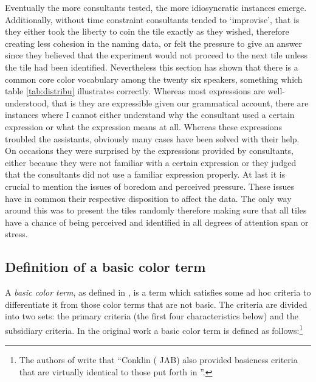 Eventually the more consultants tested, the more idiosyncratic instances emerge.
Additionally, without time constraint consultants tended to `improvise', that is
they either took the liberty to coin the tile exactly as they wished, therefore
creating less cohesion in the naming data, or felt the pressure to give  an
answer since they believed that the experiment would not proceed to the next
tile unless the tile had been identified. Nevertheless this section has shown 
that there is a common core color vocabulary among the twenty six speakers,
something which table \ref{tab:distribu} illustrates correctly. Whereas most
expressions are well-understood, that is they are expressible given our
grammatical account, there are  instances where I cannot either understand why
the consultant used a certain expression  or what the expression means at all.
Whereas these expressions troubled the assistants, obviously many cases have
been solved with their help. On occasions they were surprised by the expressions
provided by  consultants, either because they were not familiar with a certain
expression or they judged that the consultants did not use a familiar expression
properly. At last it is crucial to mention the issues of boredom and perceived
pressure. These issues have in common their respective disposition to affect the
data. The only way around this was to present the tiles randomly therefore
making sure that all tiles have a chance of being perceived and identified in
all degrees of attention span or stress. 

\clearpage

\subsection{Definition of a basic color term}
\label{sec:definitionBCT}

A \textit{basic color term}, as defined in  \citet[6-7, 37]{Berl69}, is a
term which satisfies some ad hoc criteria to differentiate it from those color
terms that are not basic. The criteria are divided into two sets: the primary
criteria (the first four characteristics below) and the subsidiary criteria. In
the original work a basic color term is defined as follows:\footnote{The authors of  
\cite{Maff97}  write that ``Conklin (\cite{Conk55} JAB) also provided
basicness criteria that are virtually identical to those put forth in
\citeauthor{Berl69}''.} 


